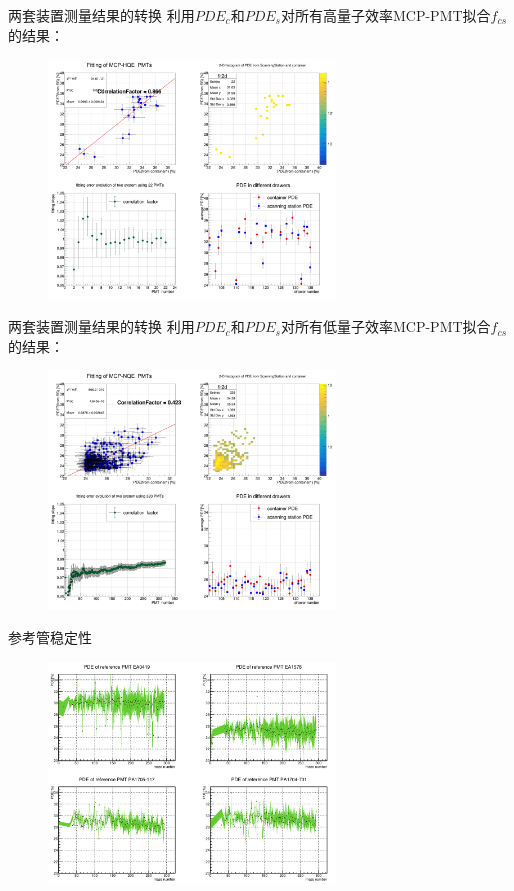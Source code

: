 \documentclass[11pt,compress,xcolor=x11names,UTF8]{beamer}
\begin{document}
\begin{frame}{两套装置测量结果的转换}
利用$PDE_c$和$PDE_s$对所有高量子效率MCP-PMT拟合$f_{cs}$的结果：
\begin{figure}
\centering
\includegraphics[width=0.68\textwidth]{fit_mcp_hqe_noint}
\end{figure}
\end{frame}
\begin{frame}{两套装置测量结果的转换}
利用$PDE_c$和$PDE_s$对所有低量子效率MCP-PMT拟合$f_{cs}$的结果：
\begin{figure}
\centering
\includegraphics[width=0.68\textwidth]{fit_mcp_nqe_noint}
\end{figure}
\end{frame}
\begin{frame}{参考管稳定性}
\begin{figure}
\centering
\includegraphics[width=0.68\textwidth]{ref_sta}
\end{figure}
\end{frame}
\end{document}
